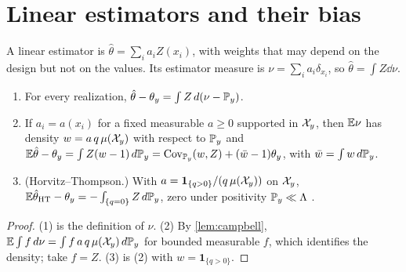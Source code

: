 \section{Linear estimators and their bias}\label{sec:linear}

A linear estimator is $\hat\theta=\sum_ia_iZ(x_i)$, with weights that may depend on the design but
not on the values. Its estimator measure is $\nu=\sum_ia_i\delta_{x_i}$, so $\hat\theta=\int Z\dd\nu$.

\begin{proposition}\label{prop:linear}
\begin{enumerate}
  \item For every realization, $\hat\theta-\theta_y=\int Z\,d(\nu-\mathbb{P}_y)$.
  \item If $a_i=a(x_i)$ for a fixed measurable $a\ge0$ supported in $\mathcal{X}_y$, then $\mathbb{E}\nu$ has density
        $w=a\,q\,\mu(\mathcal{X}_y)$ with respect to $\mathbb{P}_y$ and
        $\mathbb{E}\hat\theta-\theta_y=\int Z(w-1)\,d\mathbb{P}_y=\operatorname{Cov}_{\mathbb{P}_y}(w,Z)+(\bar w-1)\theta_y$, with
        $\bar w=\int w\,d\mathbb{P}_y$.
  \item (Horvitz--Thompson.) With $a=\mathbf 1_{\{q>0\}}/(q\,\mu(\mathcal{X}_y))$ on $\mathcal{X}_y$,
        $\mathbb{E}\hat\theta_{\mathrm{HT}}-\theta_y=-\int_{\{q=0\}}Z\,d\mathbb{P}_y$, zero under positivity
        $\mathbb{P}_y\ll\Lambda$ \citep{horvitz1952,cordy1993}.
\end{enumerate}
\end{proposition}

\begin{proof}
(1) is the definition of $\nu$. (2) By \cref{lem:campbell}, $\mathbb{E}\int f\,d\nu=\int f\,a\,q\,\mu(\mathcal{X}_y)\,d\mathbb{P}_y$
for bounded measurable $f$, which identifies the density; take $f=Z$. (3) is (2) with
$w=\mathbf 1_{\{q>0\}}$.
\end{proof}

